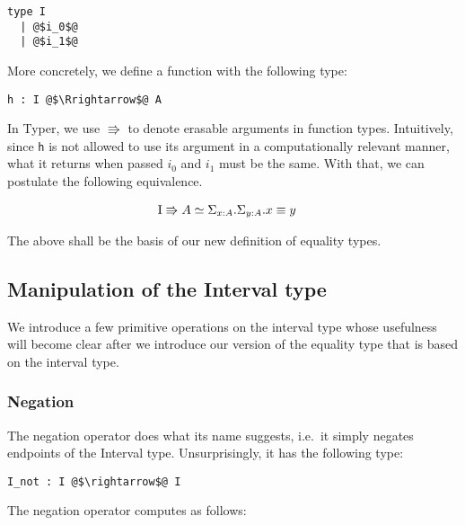 \documentclass[12pt,twoside,maitrise]{dms}
\theoremstyle{definition}
\numberwithin{equation}{section}
\numberwithin{table}{chapter}
\numberwithin{figure}{chapter}
\newcommand\id[1] {\texttt{#1}}
\begin{document}
\begin{verbatim}
type I
  | @$i_0$@
  | @$i_1$@
\end{verbatim}

More concretely, we define a function with the following type:

\begin{verbatim}
h : I @$\Rrightarrow$@ A
\end{verbatim}

In Typer, we use $\Rrightarrow$ to denote erasable arguments in function types.
Intuitively, since \id{h} is not allowed to use its argument in a
computationally relevant manner, what it returns when passed $i_0$ and $i_1$
must be the same. With that, we can postulate the following equivalence.

\begin{align*}
  & \bI \Rrightarrow A \simeq \Sigma_{\oftype{x}{A}} . \Sigma_{\oftype{y}{A}} .
  \eqtype{x}{y}
\end{align*}

The above shall be the basis of our new definition of equality types.

\subsection{Manipulation of the Interval type}\label{sec:interval-manipulation}

We introduce a few primitive operations on the interval type whose usefulness
will become clear after we introduce our version of the equality type that is
based on the interval type.

\subsubsection*{Negation}

The negation operator does what its name suggests, i.e.\ it simply negates
endpoints of the Interval type. Unsurprisingly, it has the following type:

\begin{verbatim}
I_not : I @$\rightarrow$@ I
\end{verbatim}

The negation operator computes as follows:
\end{document}
